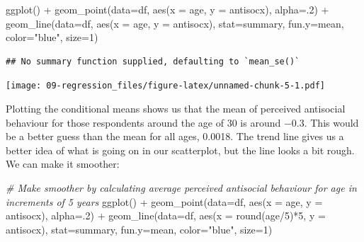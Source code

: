 \documentclass[
]{book}
\newenvironment{Shaded}{\begin{snugshade}}{\end{snugshade}}
\newcommand{\AttributeTok}[1]{\textcolor[rgb]{0.77,0.63,0.00}{#1}}
\newcommand{\CommentTok}[1]{\textcolor[rgb]{0.56,0.35,0.01}{\textit{#1}}}
\newcommand{\DecValTok}[1]{\textcolor[rgb]{0.00,0.00,0.81}{#1}}
\newcommand{\FunctionTok}[1]{\textcolor[rgb]{0.00,0.00,0.00}{#1}}
\newcommand{\NormalTok}[1]{#1}
\newcommand{\SpecialCharTok}[1]{\textcolor[rgb]{0.00,0.00,0.00}{#1}}
\newcommand{\StringTok}[1]{\textcolor[rgb]{0.31,0.60,0.02}{#1}}
\begin{document}
\begin{Shaded}
\begin{Highlighting}[]
\FunctionTok{ggplot}\NormalTok{() }\SpecialCharTok{+} 
  \FunctionTok{geom\_point}\NormalTok{(}\AttributeTok{data=}\NormalTok{df, }\FunctionTok{aes}\NormalTok{(}\AttributeTok{x =}\NormalTok{ age, }\AttributeTok{y =}\NormalTok{ antisocx), }\AttributeTok{alpha=}\NormalTok{.}\DecValTok{2}\NormalTok{) }\SpecialCharTok{+} 
  \FunctionTok{geom\_line}\NormalTok{(}\AttributeTok{data=}\NormalTok{df, }\FunctionTok{aes}\NormalTok{(}\AttributeTok{x =}\NormalTok{ age, }\AttributeTok{y =}\NormalTok{ antisocx), }\AttributeTok{stat=}\StringTok{\textquotesingle{}summary\textquotesingle{}}\NormalTok{, }\AttributeTok{fun.y=}\NormalTok{mean,}
            \AttributeTok{color=}\StringTok{"blue"}\NormalTok{, }\AttributeTok{size=}\DecValTok{1}\NormalTok{)  }
\end{Highlighting}
\end{Shaded}

\begin{verbatim}
## No summary function supplied, defaulting to `mean_se()`
\end{verbatim}

\texttt{[image: 09-regression\_files/figure-latex/unnamed-chunk-5-1.pdf]}

Plotting the conditional means shows us that the mean of perceived antisocial behaviour for those respondents around the age of 30 is around −0.3. This would be a better guess than the mean for all ages, 0.0018. The trend line gives us a better idea of what is going on in our scatterplot, but the line looks a bit rough. We can make it smoother:

\begin{Shaded}
\begin{Highlighting}[]
\CommentTok{\# Make smoother by calculating average perceived antisocial behaviour for age in increments of 5 years}
\FunctionTok{ggplot}\NormalTok{() }\SpecialCharTok{+} 
  \FunctionTok{geom\_point}\NormalTok{(}\AttributeTok{data=}\NormalTok{df, }\FunctionTok{aes}\NormalTok{(}\AttributeTok{x =}\NormalTok{ age, }\AttributeTok{y =}\NormalTok{ antisocx), }\AttributeTok{alpha=}\NormalTok{.}\DecValTok{2}\NormalTok{) }\SpecialCharTok{+} 
  \FunctionTok{geom\_line}\NormalTok{(}\AttributeTok{data=}\NormalTok{df, }\FunctionTok{aes}\NormalTok{(}\AttributeTok{x =} \FunctionTok{round}\NormalTok{(age}\SpecialCharTok{/}\DecValTok{5}\NormalTok{)}\SpecialCharTok{*}\DecValTok{5}\NormalTok{, }\AttributeTok{y =}\NormalTok{ antisocx), }\AttributeTok{stat=}\StringTok{\textquotesingle{}summary\textquotesingle{}}\NormalTok{, }\AttributeTok{fun.y=}\NormalTok{mean,}
            \AttributeTok{color=}\StringTok{"blue"}\NormalTok{, }\AttributeTok{size=}\DecValTok{1}\NormalTok{)}
\end{Highlighting}
\end{Shaded}
\end{document}
